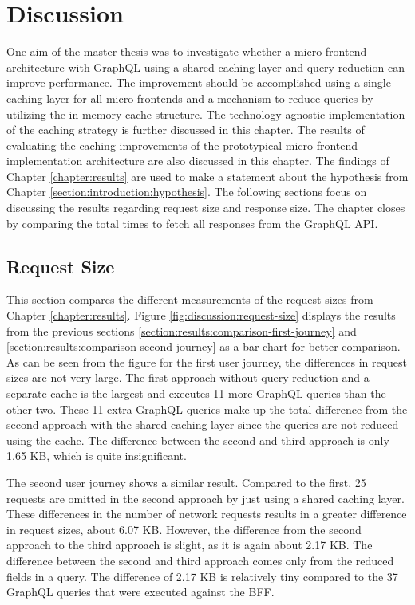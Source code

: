 \chapter{Discussion}\label{chapter:discussion}

One aim of the master thesis was to investigate whether a micro-frontend architecture with GraphQL using a shared caching layer and query reduction can improve performance. The improvement should be accomplished using a single caching layer for all micro-frontends and a mechanism to reduce queries by utilizing the in-memory cache structure. The technology-agnostic implementation of the caching strategy is further discussed in this chapter. The results of evaluating the caching improvements of the prototypical micro-frontend implementation architecture are also discussed in this chapter. The findings of Chapter \ref{chapter:results} are used to make a statement about the hypothesis from Chapter \ref{section:introduction:hypothesis}. The following sections focus on discussing the results regarding request size and response size. The chapter closes by comparing the total times to fetch all responses from the GraphQL \ac{API}.

\section{Request Size}\label{section:discussion:request-size}

This section compares the different measurements of the request sizes from Chapter \ref{chapter:results}. Figure \ref{fig:discussion:request-size} displays the results from the previous sections \ref{section:results:comparison-first-journey} and \ref{section:results:comparison-second-journey} as a bar chart for better comparison. As can be seen from the figure for the first user journey, the differences in request sizes are not very large. The first approach without query reduction and a separate cache is the largest and executes 11 more GraphQL queries than the other two. These 11 extra GraphQL queries make up the total difference from the second approach with the shared caching layer since the queries are not reduced using the cache. The difference between the second and third approach is only 1.65 KB, which is quite insignificant.

\bigskip

\noindent The second user journey shows a similar result. Compared to the first, 25 requests are omitted in the second approach by just using a shared caching layer. These differences in the number of network requests results in a greater difference in request sizes, about 6.07 KB. However, the difference from the second approach to the third approach is slight, as it is again about 2.17 KB. The difference between the second and third approach comes only from the reduced fields in a query. The difference of 2.17 KB is relatively tiny compared to the 37 GraphQL queries that were executed against the \ac{BFF}.

